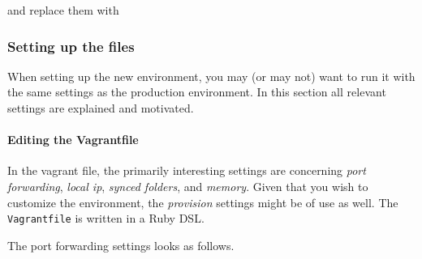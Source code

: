\begin{Shaded}
\begin{Highlighting}[numbers=left,,]
 
 
\end{Highlighting}
\end{Shaded}

and replace them with


\begin{Shaded}
\begin{Highlighting}[numbers=left,,]
 
 \KeywordTok{<}\KeywordTok{>}
\end{Highlighting}
\end{Shaded}

\subsubsection{Setting up the files}\label{setting-up-the-files}

When setting up the new environment, you may (or may not) want to run it
with the same settings as the production environment. In this section
all relevant settings are explained and motivated.

\paragraph{Editing the Vagrantfile}\label{editing-the-vagrantfile}

In the vagrant file, the primarily interesting settings are concerning
\emph{port forwarding}, \emph{local ip}, \emph{synced folders}, and
\emph{memory}. Given that you wish to customize the environment, the
\emph{provision} settings might be of use as well. The
\texttt{Vagrantfile} is written in a Ruby DSL.

The port forwarding settings looks as follows.

\begin{Shaded}
\begin{Highlighting}[numbers=left,,]
\end{Highlighting}
\end{Shaded}

